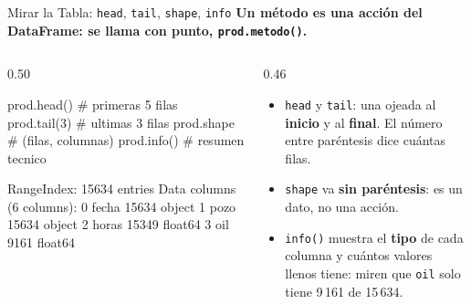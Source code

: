 \documentclass[aspectratio=169, 11pt]{beamer}
\begin{document}
\begin{frame}[fragile,shrink=18]{Mirar la Tabla: \texttt{head}, \texttt{tail}, \texttt{shape}, \texttt{info}}
  \vspace{-4pt}
  {\small\color{arcaDark}\bfseries
    Un \textbf{método} es una acción del DataFrame: se llama con punto, \texttt{prod.metodo()}.}

  \vspace{4pt}
  \begin{columns}[T]
    \begin{column}{0.50\textwidth}
      \begin{pyblock}
prod.head()    # primeras 5 filas
prod.tail(3)   # ultimas 3 filas
prod.shape     # (filas, columnas)
prod.info()    # resumen tecnico
      \end{pyblock}
      \vspace{2pt}
      \begin{outputblock}[title={\small\faTerminal\hspace{6pt}prod.info()}]
RangeIndex: 15634 entries
Data columns (6 columns):
 0  fecha   15634  object
 1  pozo    15634  object
 2  horas   15349  float64
 3  oil      9161  float64
      \end{outputblock}
    \end{column}

    \begin{column}{0.46\textwidth}
      {\scriptsize\color{textMuted}
      \begin{itemize}\setlength{\itemsep}{5pt}
        \item[{\color{arcaRed}\scriptsize\faArrowRight}]
          \texttt{head} y \texttt{tail}: una ojeada al
          \textbf{inicio} y al \textbf{final}. El número
          entre paréntesis dice cuántas filas.
        \item[{\color{arcaRed}\scriptsize\faArrowRight}]
          \texttt{shape} va \textbf{sin paréntesis}:
          es un dato, no una acción.
        \item[{\color{arcaRed}\scriptsize\faArrowRight}]
          \texttt{info()} muestra el \textbf{tipo} de cada
          columna y cuántos valores llenos tiene:
          miren que \texttt{oil} solo tiene 9\,161 de 15\,634.
      \end{itemize}
      }
    \end{column}
  \end{columns}
\end{frame}
\end{document}
